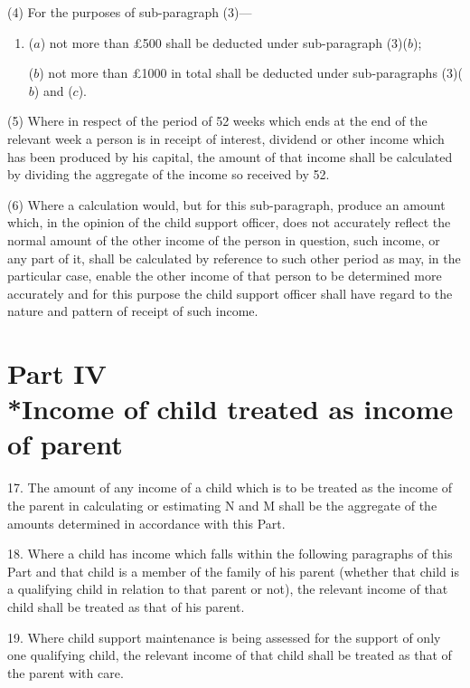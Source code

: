 \documentclass[12pt,a4paper]{article}
\begin{document}
(4) For the purposes of sub-paragraph (3)—
\begin{enumerate}\item[]
($a$) not more than £500 shall be deducted under sub-paragraph (3)($b$);

($b$) not more than £1000 in total shall be deducted under sub-\hspace{0pt}paragraphs (3)($b$) and ($c$).
\end{enumerate}

(5) Where in respect of the period of 52 weeks which ends at the end of the relevant week a person is in receipt of interest, dividend or other income which has been produced by his capital, the amount of that income shall be calculated by dividing the aggregate of the income so received by 52.

(6) Where a calculation would, but for this sub-paragraph, produce an amount which, in the opinion of the child support officer, does not accurately reflect the normal amount of the other income of the person in question, such income, or any part of it, shall be calculated by reference to such other period as may, in the particular case, enable the other income of that person to be determined more accurately and for this purpose the child support officer shall have regard to the nature and pattern of receipt of such income.

\section[Part IV --- Income of child treated as income of parent]{Part IV\\*Income of child treated as income of parent}

\renewcommand\parthead{--- Schedule 1 Part IV}

17.  The amount of any income of a child which is to be treated as the income of the parent in calculating or estimating N and M shall be the aggregate of the amounts determined in accordance with this Part.

\medskip

18.  Where a child has income which falls within the following paragraphs of this Part and that child is a member of the family of his parent (whether that child is a qualifying child in relation to that parent or not), the relevant income of that child shall be treated as that of his parent.

\medskip

19.  Where child support maintenance is being assessed for the support of only one qualifying child, the relevant income of that child shall be treated as that of the parent with care.
\end{document}
